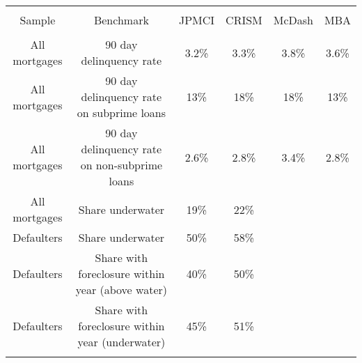 
\begin{tabular}{@{\extracolsep{5pt}} cccccc} 
\\[-1.8ex]\hline 
\hline \\[-1.8ex] 
Sample & Benchmark & JPMCI & CRISM & McDash & MBA \\ 
\hline \\[-1.8ex] 
All mortgages & 90 day delinquency rate & 3.2\% & 3.3\% & 3.8\% & 3.6\% \\ 
All mortgages & 90 day delinquency rate on subprime loans & 13\% & 18\% & 18\% & 13\% \\ 
All mortgages & 90 day delinquency rate on non-subprime loans & 2.6\% & 2.8\% & 3.4\% & 2.8\% \\ 
All mortgages & Share underwater & 19\% & 22\% &  &  \\ 
Defaulters & Share underwater & 50\% & 58\% &  &  \\ 
Defaulters & Share with foreclosure within year (above water) & 40\% & 50\% &  &  \\ 
Defaulters & Share with foreclosure within year (underwater) & 45\% & 51\% &  &  \\ 
\hline \\[-1.8ex] 
\end{tabular} 
